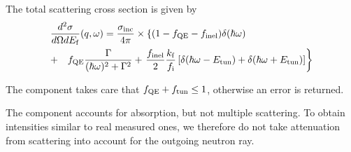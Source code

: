 The total scattering cross section is given by
\begin{eqnarray}
\lefteqn{\frac{d^2\sigma}{d\Omega dE_{\rm f}}(q,\omega) = \frac{\sigma_{\rm inc}}{4\pi}
\times \left\{ (1-f_{\rm QE}-f_{\rm inel}) \delta(\hbar \omega) \right. }  \\
 &+& f_{\rm QE} \frac{\Gamma}{(\hbar\omega)^2+\Gamma^2}
 + \left.\frac{f_{\rm inel}}{2} \frac{k_{\rm f}}{f_{\rm i}} 
   \left[\delta(\hbar\omega-E_{\rm tun}) + \delta(\hbar\omega+E_{\rm tun}) \right] \right\} \nonumber
\end{eqnarray}

The component takes care that 
$f_{\rm QE} + f_{\rm tun} \leq 1$, otherwise an error is returned.

The component accounts for absorption, 
but not multiple scattering. To obtain
intensities similar to real measured ones, we therefore do not 
take attenuation from scattering into account for the outgoing
neutron ray.

